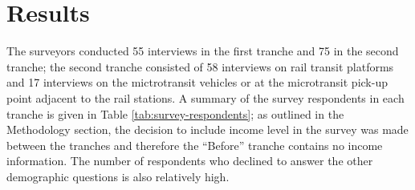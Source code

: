 \documentclass[smartcities,article,submit,moreauthors,pdftex]{Definitions/mdpi}
\begin{document}
\section{Results}

The surveyors conducted 55 interviews in the first tranche and 75 in the second tranche; the second tranche consisted of 58 interviews on rail transit platforms and 17 interviews on the mictrotransit vehicles or at the microtransit pick-up point adjacent to the rail stations. A summary of the survey respondents in each tranche is given in Table \ref{tab:survey-respondents}; as outlined in the Methodology section, the decision to include income level in the survey was made between the tranches and therefore the “Before” tranche contains no income information. The number of respondents who declined to answer the other demographic questions is also relatively high.
\end{document}
